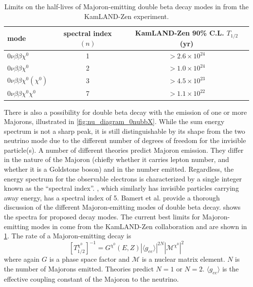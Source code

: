 \documentclass[herrin-thesis.tex]{subfiles}
\begin{document}
\begin{table}[tbp]
\centering
\caption[Current \(0\nu\beta\beta\chi^{0}(\chi^{0})\) limits]{Limits on the half-lives of Majoron-emitting double beta decay modes in  from the KamLAND-Zen experiment\cite{Gando:2012fk}.}
\label{tab:nu_majoron_limits}
\begin{tabular}{l c c}\toprule
	mode						&	spectral index \((n)\)		&	KamLAND-Zen 90\% C.L. \(T_{1/2}\) (yr)		\\\midrule
	\(0\nu\beta\beta\chi^{0}\)			&	1					&	\(>2.6\times10^{24}\)						\\
	\(0\nu\beta\beta\chi^{0}\)			&	2					&	\(>1.0\times10^{24}\)						\\
	\(0\nu\beta\beta\chi^{0}(\chi^{0})\)	&	3					&	\(>4.5\times10^{23}\)						\\
	\(0\nu\beta\beta\chi^{0}\chi^{0}\)	&	7					&	\(>1.1\times10^{22}\)						\\\bottomrule
\end{tabular}
\end{table}

There is also a possibility for double beta decay with the emission of one or more Majorons, illustrated in \cref{fig:nu_diagram_0nubbX}. While the sum energy spectrum is not a sharp peak, it is still distinguishable by its shape from the two neutrino mode due to the different number of degrees of freedom for the invisible particle(s). A number of different theories predict Majoron emission. They differ in the nature of the Majoron (chiefly whether it carries lepton number, and whether it is a Goldstone boson) and in the number emitted. Regardless, the energy spectrum for the observable electrons is characterized by a single integer known as the ``spectral index''. \twonu{}, which similarly has invisible particles carrying away energy, has a spectral index of 5. Bamert et al.\cite{Bamert:1995fk} provide a thorough discussion of the different Majoron-emitting modes of double beta decay.  shows the spectra for proposed decay modes. The current best limits for Majoron-emitting modes in  come from the KamLAND-Zen collaboration\cite{Gando:2012fk} and are shown in \cref{tab:nu_majoron_limits}. The rate of a Majoron-emitting decay is
\begin{equation}
\left [ T^{\chi^0}_{1/2} \right ]^{-1} = G^{\chi^{0}}\left(E, Z\right)\left | \langle g_{e e} \rangle \right |^{2N}\left | \mathcal{M}^{\chi^{0}}\right |^2
\label{eq:nu_majoron_rate}
\end{equation}
where again \(G\) is a phase space factor and \(\mathcal{M}\) is a nuclear matrix element. \(N\) is the number of Majorons emitted. Theories predict \(N=1\) or \(N=2\). \(\langle g_{e e} \rangle\) is the effective coupling constant of the Majoron to the neutrino.
\end{document}
